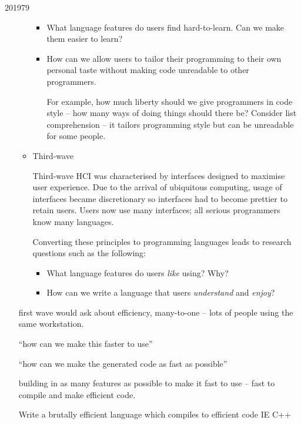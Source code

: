\documentclass[10pt,\jkfside,a4paper]{article}
\begin{document}
\begin{examquestion}{2019}{7}{9}
\begin{enumerate}
\begin{itemize}
\begin{itemize}
\item What language features do users find hard-to-learn. Can we make them
easier to learn?

\item How can we allow users to tailor their programming to their own
personal taste without making code unreadable to other programmers.

For example, how much liberty should we give programmers in code style --
how many ways of doing things should there be? Consider list comprehension
-- it tailors programming style but can be unreadable for some people.

\end{itemize}

\item Third-wave

Third-wave HCI was characterised by interfaces designed to maximise user
experience. Due to the arrival of ubiquitous computing, usage of interfaces
became discretionary so interfaces had to become prettier to retain users.
Users now use many interfaces; all serious programmers know many
languages.

Converting these principles to programming languages leads to research
questions such as the following:

\begin{itemize}

\item What language features do users \textit{like} using? Why?

\item How can we write a language that users \textit{understand} and
\textit{enjoy}?

\end{itemize}

\end{itemize}

\iffalse

first wave would ask about efficiency, many-to-one -- lots of people using
the same workstation.

``how can we make this faster to use''

``how can we make the generated code as fast as possible''

building in as many features as possible to make it fast to use -- fast to
compile and make efficient code.

Write a brutally efficient language which compiles to efficient code IE C++




\end{enumerate}
\end{examquestion}
\end{document}
